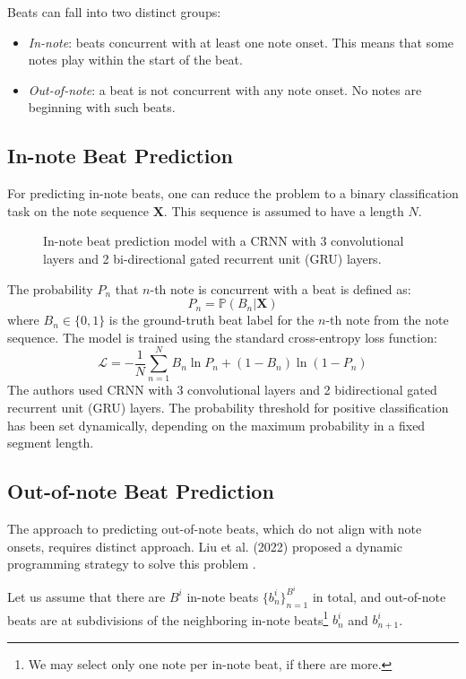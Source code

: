 Beats can fall into two distinct groups:
\begin{itemize}
	\item \emph{In-note}: beats concurrent with at least one note onset. This means that some notes play within the start of the beat.
	\item \emph{Out-of-note}: a beat is not concurrent with any note onset. No notes are beginning with such beats.
\end{itemize}

\subsection{In-note Beat Prediction}

For predicting in-note beats, one can reduce the problem to a binary classification task on the note sequence $\mathbf{X}$. This sequence is assumed to have a length $N$.

\begin{figure}[!ht]
\centering

\caption[In-note beat prediction model]{In-note beat prediction model with a CRNN with 3 convolutional layers and 2 bi-directional gated recurrent unit (GRU) layers.}
\end{figure}

The probability $P_n$ that $n$-th note is concurrent with a beat is defined as: \[P_n = \mathbb{P}\left(B_n|\mathbf{X}\right)\] where $B_n\in\{0,1\}$ is the ground-truth beat label for the $n$-th note from the note sequence. The model is trained using the standard cross-entropy loss function: \[\mathcal{L}=-\frac{1}{N}\sum_{n=1}^N B_n\ln P_n + \left(1-B_n\right)\ln\left(1-P_n\right)\] The authors used CRNN with 3 convolutional layers and 2 bidirectional gated recurrent unit (GRU) layers. The probability threshold for positive classification has been set dynamically, depending on the maximum probability in a fixed segment length.

\subsection{Out-of-note Beat Prediction}

The approach to predicting out-of-note beats, which do not align with note onsets, requires distinct approach. Liu et al. (2022) proposed a dynamic programming strategy to solve this problem \cite{Liu2022}.

Let us assume that there are $B^i$ in-note beats $\{b_n^i\}_{n=1}^{B^i}$ in total, and out-of-note beats are at subdivisions of the neighboring in-note beats\footnote{We may select only one note per in-note beat, if there are more.} $b_{n}^i$ and $b_{n+1}^i$.

